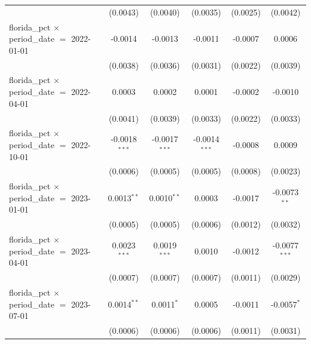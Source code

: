\begin{table}[htbp]
\begin{tabular}{lccccc}
                                                           & (0.0043)        & (0.0040)               & (0.0035)        & (0.0025)              & (0.0042)\\   
      florida\_pct $\times$ period\_date $=$ 2022-01-01    & -0.0014         & -0.0013                & -0.0011         & -0.0007               & 0.0006\\   
                                                           & (0.0038)        & (0.0036)               & (0.0031)        & (0.0022)              & (0.0039)\\   
      florida\_pct $\times$ period\_date $=$ 2022-04-01    & 0.0003          & 0.0002                 & 0.0001          & -0.0002               & -0.0010\\   
                                                           & (0.0041)        & (0.0039)               & (0.0033)        & (0.0022)              & (0.0033)\\   
      florida\_pct $\times$ period\_date $=$ 2022-10-01    & -0.0018$^{***}$ & -0.0017$^{***}$        & -0.0014$^{***}$ & -0.0008               & 0.0009\\   
                                                           & (0.0006)        & (0.0005)               & (0.0005)        & (0.0008)              & (0.0023)\\   
      florida\_pct $\times$ period\_date $=$ 2023-01-01    & 0.0013$^{**}$   & 0.0010$^{**}$          & 0.0003          & -0.0017               & -0.0073$^{**}$\\   
                                                           & (0.0005)        & (0.0005)               & (0.0006)        & (0.0012)              & (0.0032)\\   
      florida\_pct $\times$ period\_date $=$ 2023-04-01    & 0.0023$^{***}$  & 0.0019$^{***}$         & 0.0010          & -0.0012               & -0.0077$^{***}$\\   
                                                           & (0.0007)        & (0.0007)               & (0.0007)        & (0.0011)              & (0.0029)\\   
      florida\_pct $\times$ period\_date $=$ 2023-07-01    & 0.0014$^{**}$   & 0.0011$^{*}$           & 0.0005          & -0.0011               & -0.0057$^{*}$\\   
                                                           & (0.0006)        & (0.0006)               & (0.0006)        & (0.0011)              & (0.0031)\\   

\end{tabular}
\end{table}
